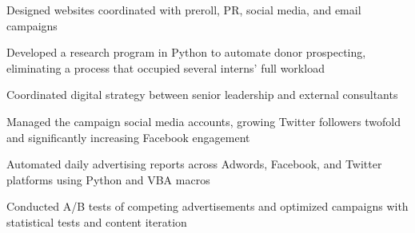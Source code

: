 \begin{listitems}
\item Designed websites coordinated with preroll, PR, social media, and email campaigns
\item Developed a research program in Python to automate donor prospecting, eliminating a process that occupied several interns' full workload
\item Coordinated digital strategy between senior leadership and external consultants
\item Managed the campaign social media accounts, growing Twitter followers twofold and significantly increasing Facebook engagement
\end{listitems}
\sectionsep

\begin{listitems}
\item Automated daily advertising reports across Adwords, Facebook, and Twitter platforms using Python and VBA macros
\item Conducted A/B tests of competing advertisements and optimized campaigns with statistical tests and content iteration
\end{listitems}
\sectionsep
